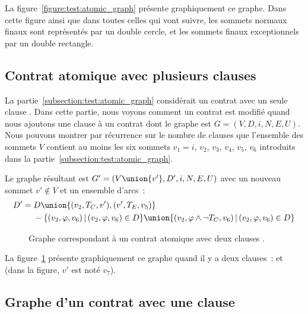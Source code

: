 La figure~\ref{figure:test:atomic_graph} présente graphiquement ce graphe. Dans
cette figure ainsi que dans toutes celles qui vont suivre, les sommets normaux
finaux sont représentés par un double cercle, et les sommets finaux
exceptionnels par un double rectangle.

\subsection{Contrat atomique avec plusieurs clauses \athrowable}
\label{subsection:test:throwable_graph}

La partie~\ref{subsection:test:atomic_graph} considérait un contrat avec un
seule clause \athrowable. Dans cette partie, nous voyons comment un contrat est
modifié quand nous ajoutons une clause  à un
contrat dont le graphe est $G = (V, D, i, N, E, U)$. Nous pouvons montrer par
récurrence sur le nombre de clauses \athrowable que l'ensemble des sommets $V$
contient au moins les six sommets $v_1 = i$, $v_2$, $v_3$, $v_4$, $v_5$, $v_6$
introduits dans la partie~\ref{subsection:test:atomic_graph}.

Le graphe résultant est $G' = (V \union \{v'\}, D', i, N, E, U)$ avec un nouveau
sommet $v' \notin V$ et un ensemble d'arcs~:
%
\begin{equation*}
\centering
\begin{aligned}
D' =\; & D \union \{(v_2, T_C, v'), (v', T_E, v_5)\} \\
     & - \{(v_2, \varphi, v_6) \,\vert\, (v_2, \varphi, v_6) \in D\} \union
       \{(v_2, \varphi \land \neg T_C, v_6) \,\vert\, (v_2, \varphi, v_6) \in D\}
\end{aligned}
\end{equation*}

\begin{figure}


\caption{\label{figure:test:throwable_graph} Graphe correspondant à un contrat
atomique avec deux clauses \athrowable.}

\end{figure}

La figure~\ref{figure:test:throwable_graph} présente graphiquement ce graphe
quand il y a deux clauses~:  et
 (dans la figure, $v'$ est noté
$v_7$).

\subsection{Graphe d'un contrat avec une clause \abehavior}
\label{subsection:test:behavior_graph}

